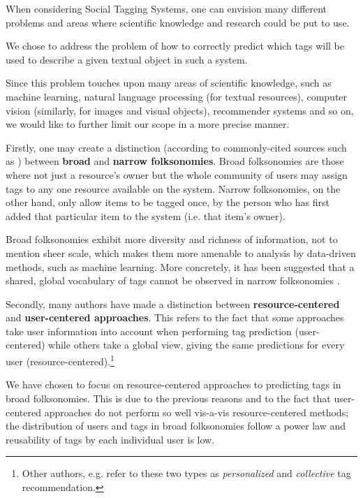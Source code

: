 When considering Social Tagging Systems, one can envision many different problems and areas where scientific knowledge and research could be put to use.

We chose to address the problem of how to correctly predict which tags will be used to describe a given textual object in such a system. 

Since this problem touches upon many areas of scientific knowledge, such as machine learning, natural language processing (for textual resources), computer vision (similarly, for images and visual objects), recommender systems and so on, we would like to further limit our scope in a more precise manner.

Firstly, one may create a distinction (according to commonly-cited sources such as \cite{wal_2005_broad_and_narrow}) between \textbf{broad} and \textbf{narrow folksonomies}. Broad folksonomies are those where not just a resource's owner but the whole community of users may assign tags to any one resource available on the system. Narrow folksonomies, on the other hand, only allow items to be tagged once, by the person who has first added that particular item to the system (i.e. that item's owner).

Broad folksonomies exhibit more diversity and richness of information, not to mention sheer scale, which makes them more amenable to analysis by data-driven methods, such as machine learning. More concretely, it has been suggested that a shared, global vocabulary of tags cannot be observed in narrow folksonomies \citep{schifanella_etal_2010}.

Secondly, many authors \citep{illig_etal_2011,song_etal_2011} have made a distinction between \textbf{resource-centered} and \textbf{user-centered approaches}. This refers to the fact that some approaches take user information into account when performing tag prediction (user-centered) while others take a global view, giving the same predictions for every user (resource-centered).\footnote{Other authors, e.g. \cite{zhang_etal_2014} refer to these two types as \textit{personalized} and \textit{collective} tag recommendation.}

We have chosen to focus on resource-centered approaches to predicting tags in broad folksonomies. This is due to the previous reasons and to the fact \citep{song_etal_2011} that user-centered approaches do not perform so well vis-a-vis resource-centered methods; the distribution of users and tags in broad folksonomies follow a power law and reusability of tags by each individual user is low. 

